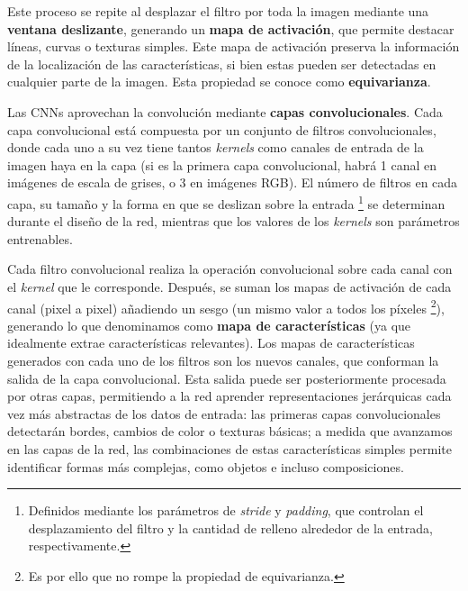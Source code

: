 Este proceso se repite al desplazar el filtro por toda la imagen mediante una \textbf{ventana deslizante}, 
generando un \textbf{mapa de activación}, que permite destacar líneas, curvas o texturas simples. Este mapa de
activación preserva la información de la localización de las características, si bien estas pueden ser 
detectadas en cualquier parte de la imagen. Esta propiedad se conoce como \textbf{equivarianza}. 

Las CNNs aprovechan la convolución mediante \textbf{capas convolucionales}. Cada capa convolucional está
compuesta por un conjunto de filtros convolucionales, donde cada uno a su vez tiene tantos \textit{kernels} 
como canales de entrada de la imagen haya en la capa (si es la primera capa convolucional, habrá 1 canal en 
imágenes de escala de grises, o 3 en imágenes RGB). El número de filtros en cada capa, su tamaño y la forma
en que se deslizan sobre la entrada%
\footnote{                                                                      
    Definidos mediante los parámetros de \textit{stride} y \textit{padding}, que controlan el desplazamiento       
    del filtro y la cantidad de relleno alrededor de la entrada, respectivamente.
}
se determinan durante el diseño de la red, mientras que los valores de los \textit{kernels} son parámetros 
entrenables.

Cada filtro convolucional realiza la operación convolucional sobre cada canal con el \textit{kernel} que le 
corresponde. Después, se suman los mapas de activación de cada canal (pixel a pixel) añadiendo un sesgo 
(un mismo valor a todos los píxeles%
\footnote{
    Es por ello que no rompe la propiedad de equivarianza.
}),
generando lo que denominamos como \textbf{mapa de características} (ya que idealmente extrae 
características relevantes). Los mapas de características generados con cada uno de los filtros son los nuevos 
canales, que conforman la salida de la capa convolucional. Esta salida puede ser posteriormente procesada por 
otras capas, permitiendo a la red aprender representaciones jerárquicas cada vez más abstractas de los datos 
de entrada: las primeras capas convolucionales detectarán bordes, cambios de color o texturas básicas; a 
medida que avanzamos en las capas de la red, las combinaciones de estas características simples permite 
identificar formas más complejas, como objetos e incluso composiciones.

